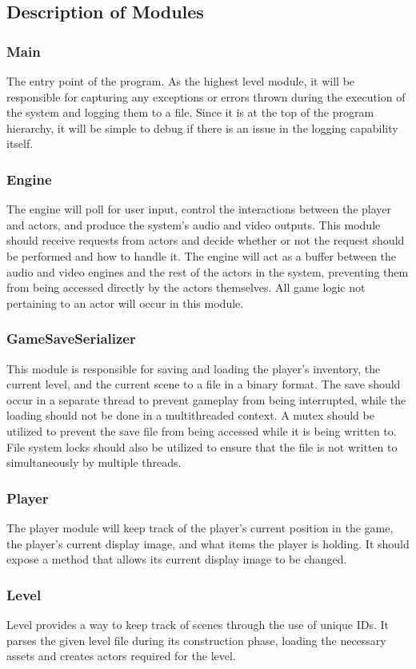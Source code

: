\documentclass{article}
\begin{document}
  \subsection{Description of Modules}
    \subsubsection{Main}
      The entry point of the program. As the highest level module, it will be responsible for capturing any exceptions or errors thrown during the execution of the system and logging them to a file. Since it is at the top of the program hierarchy, it will be simple to debug if there is an issue in the logging capability itself.
    \subsubsection{Engine}
      The engine will poll for user input, control the interactions between the player and actors, and produce the system's audio and video outputs. This module should receive requests from actors and decide whether or not the request should be performed and how to handle it. The engine will act as a buffer between the audio and video engines and the rest of the actors in the system, preventing them from being accessed directly by the actors themselves. All game logic not pertaining to an actor will occur in this module.
    \subsubsection{GameSaveSerializer}
      This module is responsible for saving and loading the player's inventory, the current level, and the current scene to a file in a binary format. The save should occur in a separate thread to prevent gameplay from being interrupted, while the loading should not be done in a multithreaded context. A mutex should be utilized to prevent the save file from being accessed while it is being written to. File system locks should also be utilized to ensure that the file is not written to simultaneously by multiple threads.
    \subsubsection{Player}
      The player module will keep track of the player's current position in the game, the player's current display image, and what items the player is holding. It should expose a method that allows its current display image to be changed.
    \subsubsection{Level}
      Level provides a way to keep track of scenes through the use of unique IDs. It parses the given level file during its construction phase, loading the necessary assets and creates actors required for the level.
\end{document}
